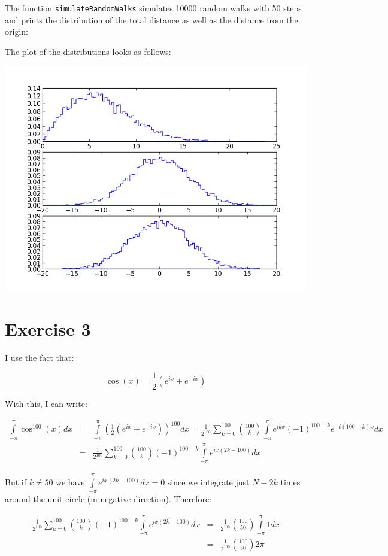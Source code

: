 \documentclass[%
]
{scrartcl}
\theoremstyle{plain}
\begin{document}
The function \texttt{simulateRandomWalks} simulates 10000 random walks with 50 steps and prints the distribution of the total distance as well as the distance from the origin:



The plot of the distributions looks as follows:

\begin{center}
\centering
\includegraphics[width=0.6\linewidth]{../RandomWalk.png}
\end{center}

\section*{Exercise 3}

I use the fact that:

\begin{equation*}
\cos(x)=\frac{1}{2}(e^{ix}+e^{-ix})
\end{equation*}

With this, I can write:

\begin{eqnarray*}
\int\limits_{-\pi}^{\pi}\cos^{100}(x)dx&=&\int\limits_{-\pi}^{\pi}(\frac{1}{2}(e^{ix}+e^{-ix}))^{100}dx=\frac{1}{2^{100}}\sum\limits_{k=0}^{100}\binom{100}{k}\int\limits_{-\pi}^{\pi}e^{ikx}(-1)^{100-k}e^{-i(100-k)x}dx\\
&=&\frac{1}{2^{100}}\sum\limits_{k=0}^{100}\binom{100}{k}(-1)^{100-k}\int\limits_{-\pi}^{\pi}e^{ix(2k-100)}dx
\end{eqnarray*}

But if $k\neq 50$ we have $\int\limits_{-\pi}^{\pi}e^{ix(2k-100)}dx=0$ since we integrate just $N-2k$ times around the unit circle (in negative direction). Therefore:

\begin{eqnarray*}
\frac{1}{2^{100}}\sum\limits_{k=0}^{100}\binom{100}{k}(-1)^{100-k}\int\limits_{-\pi}^{\pi}e^{ix(2k-100)}dx&=&\frac{1}{2^{100}}\binom{100}{50}\int\limits_{-\pi}^{\pi}1dx\\
&=&\frac{1}{2^{100}}\binom{100}{50}2\pi
\end{eqnarray*}
\end{document}
